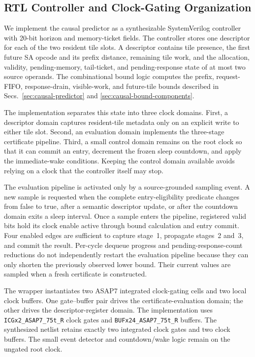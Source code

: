 \subsection{RTL Controller and Clock-Gating Organization}
\label{sec:rtl-clock-gating}

We implement the causal predictor as a synthesizable SystemVerilog controller
with 20-bit horizon and memory-ticket fields.  The controller stores one
descriptor for each of the two resident tile slots.  A descriptor contains
tile presence, the first future SA opcode and its prefix distance, remaining
tile work, and the allocation, validity, pending-memory, tail-ticket, and
pending-response state of at most two source operands.  The combinational
bound logic computes the prefix, request-FIFO, response-drain, visible-work,
and future-tile bounds described in
Secs.~\ref{sec:causal-predictor} and
\ref{sec:causal-bound-components}.

The implementation separates this state into three clock domains.  First, a
descriptor domain captures resident-tile metadata only on an explicit write
to either tile slot.  Second, an evaluation domain implements the three-stage
certificate pipeline.  Third, a small control domain remains on the root
clock so that it can commit an entry, decrement the frozen sleep countdown,
and apply the immediate-wake conditions.  Keeping the control domain
available avoids relying on a clock that the controller itself may stop.

The evaluation pipeline is activated only by a source-grounded sampling
event.  A new sample is requested when the complete entry-eligibility
predicate changes from false to true, after a semantic descriptor update, or
after the countdown domain exits a sleep interval.  Once a sample enters the
pipeline, registered valid bits hold its clock enable active through bound
calculation and entry commit.  Four enabled edges are sufficient to capture
stage~1, propagate stages~2 and~3, and commit the result.  Per-cycle dequeue
progress and pending-response-count reductions do not independently restart
the evaluation pipeline because they can only shorten the previously observed
lower bound.  Their current values are sampled when a fresh certificate is
constructed.

The wrapper instantiates two ASAP7 integrated clock-gating cells and two local
clock buffers.  One gate--buffer pair drives the certificate-evaluation
domain; the other drives the descriptor-register domain.  The implementation
uses \texttt{ICGx2\_ASAP7\_75t\_R} clock gates and
\texttt{BUFx24\_ASAP7\_75t\_R} buffers.  The synthesized netlist retains
exactly two integrated clock gates and two clock buffers.  The small event
detector and countdown/wake logic remain on the ungated root clock.


